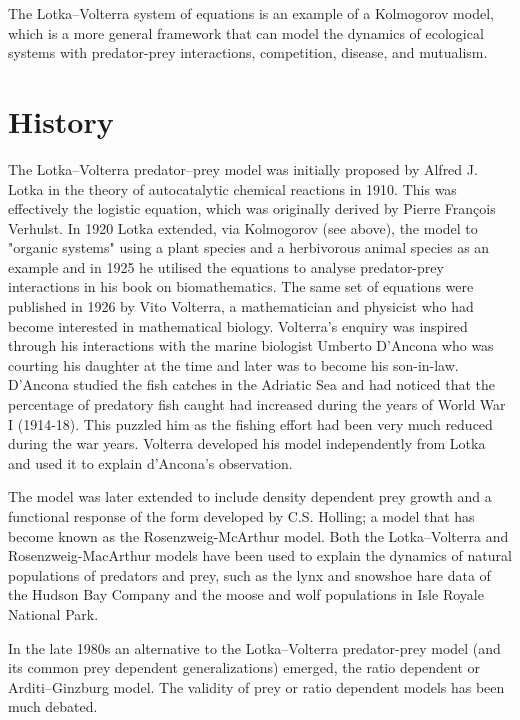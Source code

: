 \documentclass{article}
\begin{document}
The Lotka–Volterra system of equations is an example of a Kolmogorov model,\cite{ref1}\cite{ref2}\cite{ref3} which is a more general framework that can model the dynamics of ecological systems with predator-prey interactions, competition, disease, and mutualism.

\section{History}

The Lotka–Volterra predator–prey model was initially proposed by Alfred J. Lotka in the theory of autocatalytic chemical reactions in 1910.\cite{ref4}\cite{ref5} This was effectively the logistic equation,\cite{ref6} which was originally derived by Pierre François Verhulst.\cite{ref7} In 1920 Lotka extended, via Kolmogorov (see above), the model to "organic systems" using a plant species and a herbivorous animal species as an example and in 1925 he utilised the equations to analyse predator-prey interactions in his book on biomathematics. The same set of equations were published in 1926 by Vito Volterra, a mathematician and physicist who had become interested in mathematical biology.\cite{ref5} Volterra's enquiry was inspired through his interactions with the marine biologist Umberto D'Ancona who was courting his daughter at the time and later was to become his son-in-law. D'Ancona studied the fish catches in the Adriatic Sea and had noticed that the percentage of predatory fish caught had increased during the years of World War I (1914-18). This puzzled him as the fishing effort had been very much reduced during the war years. Volterra developed his model independently from Lotka and used it to explain d'Ancona's observation.

The model was later extended to include density dependent prey growth and a functional response of the form developed by C.S. Holling; a model that has become known as the Rosenzweig-McArthur model. Both the Lotka–Volterra and Rosenzweig-MacArthur models have been used to explain the dynamics of natural populations of predators and prey, such as the lynx and snowshoe hare data of the Hudson Bay Company and the moose and wolf populations in Isle Royale National Park.\cite{ref8}

In the late 1980s an alternative to the Lotka–Volterra predator-prey model (and its common prey dependent generalizations) emerged, the ratio dependent or Arditi–Ginzburg model. The validity of prey or ratio dependent models has been much debated.
\end{document}
